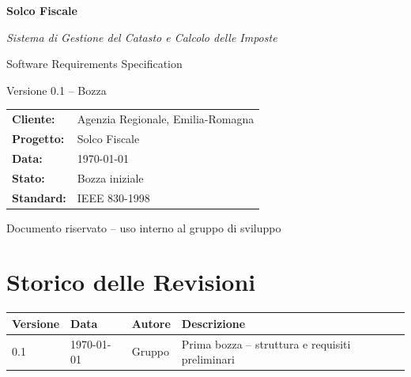 \documentclass[12pt, a4paper]{article}
\begin{document}
\begin{titlepage}
  \centering
  \vspace*{2cm}
  {\Huge\bfseries\color{headerblue} Solco Fiscale\par}
  \vspace{0.5cm}
  {\large\itshape Sistema di Gestione del Catasto e Calcolo delle Imposte\par}
  \vspace{2cm}
  {\LARGE Software Requirements Specification\par}
  \vspace{0.5cm}
  {\large Versione 0.1 -- Bozza\par}
  \vspace{3cm}
  \begin{tabular}{ll}
    \textbf{Cliente:}   & Agenzia Regionale, Emilia-Romagna \\[4pt]
    \textbf{Progetto:}  & Solco Fiscale                     \\[4pt]
    \textbf{Data:}      & \today                            \\[4pt]
    \textbf{Stato:}     & Bozza iniziale                    \\[4pt]
    \textbf{Standard:}  & IEEE 830-1998                     \\
  \end{tabular}
  \vfill
  {\small Documento riservato -- uso interno al gruppo di sviluppo}
\end{titlepage}

\section*{Storico delle Revisioni}
\begin{tabularx}{\textwidth}{lllX}
  \toprule
  \textbf{Versione} & \textbf{Data} & \textbf{Autore} & \textbf{Descrizione} \\
  \midrule
  0.1 & \today & Gruppo & Prima bozza -- struttura e requisiti preliminari \\
  \bottomrule
\end{tabularx}
\vspace{1cm}

\tableofcontents
\newpage

\end{document}
